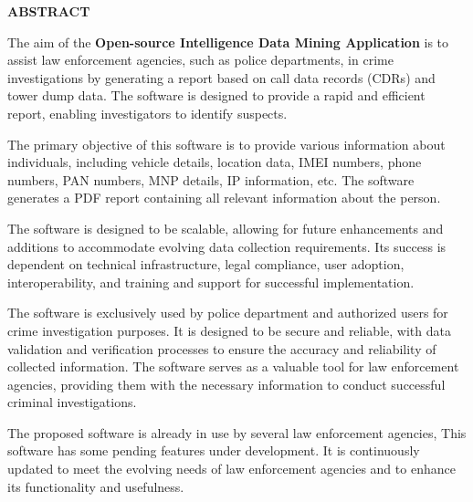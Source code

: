 \thispagestyle{plain}
\begin{center}
    \Large \textbf{\uppercase{Abstract}}
\end{center}

\vspace{3\baselineskip}

\vspace{1ex}


\justify

 The aim of the \textbf{Open-source Intelligence Data Mining Application}  is to assist law enforcement agencies, such as police departments, in crime investigations by generating a report based on call data records (CDRs) and tower dump data. The software is designed to provide a rapid and efficient report, enabling investigators to identify suspects.

The primary objective of this software is to provide various information about individuals, including vehicle details, location data, IMEI numbers, phone numbers, PAN numbers, MNP details, IP information, etc. The software generates a PDF report containing all relevant information about the person.

The software is designed to be scalable, allowing for future enhancements and additions to accommodate evolving data collection requirements. Its success is dependent on technical infrastructure, legal compliance, user adoption, interoperability, and training and support for successful implementation.

The software is exclusively used by police department and authorized users for crime investigation purposes. It is designed to be secure and reliable, with data validation and verification processes to ensure the accuracy and reliability of collected information. The software serves as a valuable tool for law enforcement agencies, providing them with the necessary information to conduct successful criminal investigations.

The proposed software is already in use by several law enforcement agencies, This software has some pending features under development. It is continuously updated to meet the evolving needs of law enforcement agencies and to enhance its functionality and usefulness.